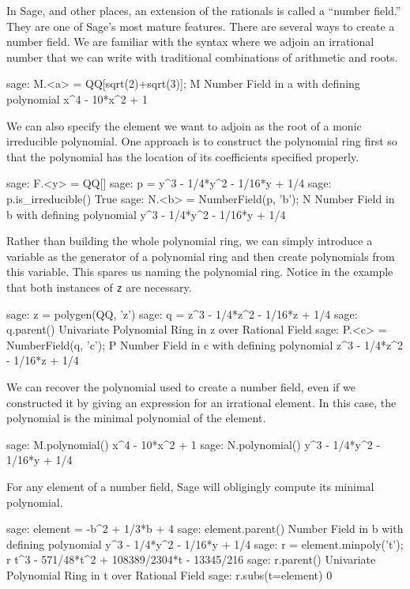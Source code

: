 In Sage, and other places, an extension of the rationals is called a ``number field.''  They are one of Sage's most mature features.
%
%
There are several ways to create a number field.  We are familiar with the syntax where we adjoin an irrational number that we can write with traditional combinations of arithmetic and roots.
%
\begin{sageexample}
sage: M.<a> = QQ[sqrt(2)+sqrt(3)]; M
Number Field in a with defining polynomial x^4 - 10*x^2 + 1
\end{sageexample}
%
We can also specify the element we want to adjoin as the root of a monic irreducible polynomial.  One approach is to construct the polynomial ring first so that the polynomial has the location of its coefficients specified properly.
%
\begin{sageexample}
sage: F.<y> = QQ[]
sage: p = y^3 - 1/4*y^2 - 1/16*y + 1/4
sage: p.is_irreducible()
True
sage: N.<b> = NumberField(p, 'b'); N
Number Field in b with
defining polynomial y^3 - 1/4*y^2 - 1/16*y + 1/4
\end{sageexample}
%
Rather than building the whole polynomial ring, we can simply introduce a variable as the generator of a polynomial ring and then create polynomials from this variable.  This spares us naming the polynomial ring.  Notice in the example that both instances of \verb?z? are necessary.
%
\begin{sageexample}
sage: z = polygen(QQ, 'z')
sage: q = z^3 - 1/4*z^2 - 1/16*z + 1/4
sage: q.parent()
Univariate Polynomial Ring in z over Rational Field
sage: P.<c> = NumberField(q, 'c'); P
Number Field in c with
defining polynomial z^3 - 1/4*z^2 - 1/16*z + 1/4
\end{sageexample}
%
We can recover the polynomial used to create a number field, even if we constructed it by giving an expression for an irrational element.  In this case, the polynomial is the minimal polynomial of the element.
%
\begin{sageexample}
sage: M.polynomial()
x^4 - 10*x^2 + 1
sage: N.polynomial()
y^3 - 1/4*y^2 - 1/16*y + 1/4
\end{sageexample}
%
For any element of a number field, Sage will obligingly compute its minimal polynomial.
%
\begin{sageexample}
sage: element = -b^2 + 1/3*b + 4
sage: element.parent()
Number Field in b with
defining polynomial y^3 - 1/4*y^2 - 1/16*y + 1/4
sage: r = element.minpoly('t'); r
t^3 - 571/48*t^2 + 108389/2304*t - 13345/216
sage: r.parent()
Univariate Polynomial Ring in t over Rational Field
sage: r.subs(t=element)
0
\end{sageexample}
